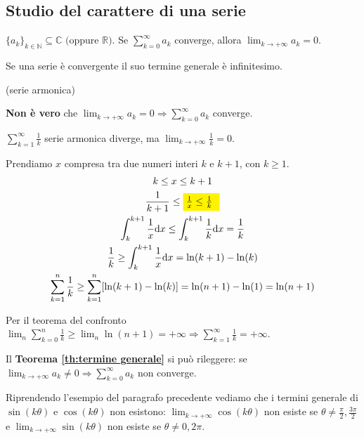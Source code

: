 	
\subsection{Studio del carattere di una serie}
\begin{theorem}
	\label{th:termine generale}
	$\{a_k \}_{k\in\mathbb{N}} \subseteq \mathbb{C}$ $($oppure $\mathbb{R})$. Se $\sum_{k=0}^\infty a_k$ converge, allora $\lim_{k\rightarrow+\infty} a_k = 0$.
\end{theorem}
Se una serie è convergente il suo termine generale è infinitesimo.

\begin{exbar}
	\begin{example} (serie armonica)
		
		\textbf{Non è vero} che $\lim_{k\rightarrow+\infty} a_k = 0 \Rightarrow \sum_{k=0}^\infty a_k$ converge.
		
		$\sum_{k=1}^\infty \frac{1}{k}$ serie armonica diverge, ma $\lim_{k\rightarrow+\infty}\frac{1}{k} = 0$.
		
		Prendiamo $x$ compresa tra due numeri interi $k$ e $k+1$, con $k\geq 1$.
		\begin{gather*}
			k\leq x \leq k+1
			\\
			\frac{1}{k+1} \leq \colorbox{yellow}{\parbox{1.1cm}{$\frac{1}{x} \leq \frac{1}{k}$}}
			\\
			\int_{k}^{k+1} \frac{1}{x} \mathrm{d}x \leq \int_{k}^{k+1} \frac{1}{k} \mathrm{d}x = \frac{1}{k}
			\\
			\frac{1}{k} \geq \int_{k}^{k+1} \frac{1}{x} \mathrm{d}x = \ln(k+1) -\ln(k)
			\\
			\sum_{k=1}^n \frac{1}{k} \geq \sum_{k=1}^n [\ln(k+1)-\ln(k)] = \ln(n+1)-\ln(1) = \ln(n+1) 
		\end{gather*}
		
		Per il teorema del confronto $\lim_{n}\sum_{k=0}^n \frac{1}{k} \geq \lim_{n} \ln(n+1) = +\infty \Rightarrow \sum_{k=1}^\infty \frac{1}{k} = +\infty$.
	\end{example}
\end{exbar}

\begin{attbar}
	Il \textbf{Teorema \ref{th:termine generale}} si può rileggere: se $\lim_{k\rightarrow+\infty} a_k \neq 0 \Rightarrow \sum_{k=0}^\infty a_k$ non converge.
\end{attbar}

Riprendendo l'esempio del paragrafo precedente vediamo che i termini generale di $\sin(k\theta)$ e $\cos(k\theta)$ non esistono: $\lim_{k\rightarrow+\infty} \cos(k\theta)$ non esiste se $\theta \neq \frac{\pi}{2}, \frac{3\pi}{2}$ e $\lim_{k\rightarrow+\infty} \sin(k\theta)$ non esiste se $\theta\neq 0, 2\pi$.

